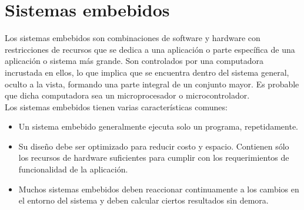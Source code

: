 \section{Sistemas embebidos}
	Los sistemas embebidos son combinaciones de software y hardware con restricciones de recursos que se dedica a una aplicación o parte específica de una aplicación o sistema más grande. Son controlados por una computadora incrustada en ellos, lo que implica que se encuentra dentro del sistema general, oculto a la vista, formando una parte integral de un conjunto mayor. Es probable que dicha computadora sea un microprocesador o microcontrolador.\\
	
	Los sistemas embebidos tienen varias características comunes:
	\begin{itemize}
		\item Un sistema embebido generalmente ejecuta solo un programa, repetidamente.
		\item Su diseño debe ser optimizado para reducir costo y espacio. Contienen sólo los recursos de hardware suficientes para cumplir con  los  requerimientos  de  funcionalidad  de  la  aplicación.
		\item Muchos sistemas embebidos deben reaccionar continuamente a los cambios en el entorno del sistema y deben calcular ciertos resultados sin demora.
	\end{itemize}
